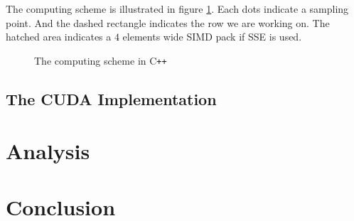 \documentclass[a4paper,12pt]{article}
\begin{document}
The computing scheme is illustrated in figure \ref{fig:computing-scheme-cpp}.
Each dots indicate a sampling point.
And the dashed rectangle indicates the row we are working on.
The hatched area indicates a $4$ elements wide SIMD pack if SSE is used.

\begin{figure}[h]
\centering
{}
\caption{The computing scheme in C\texttt{++}}
\label{fig:computing-scheme-cpp}
\end{figure}

\subsection{The CUDA Implementation}



\section{Analysis}

\section{Conclusion}

\newpage
{}


\end{document}
